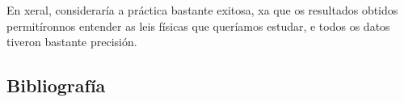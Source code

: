 \documentclass[12pt, a4paper, titlepage]{article}
\begin{document}
  En xeral, consideraría a práctica bastante exitosa, xa que os resultados obtidos permitíronnos entender as leis físicas que queríamos estudar, e todos os datos tiveron bastante precisión.

  \begin{appendices}
    \makeatletter

    \section{Bibliografía}



  \end{appendices}
\end{document}
